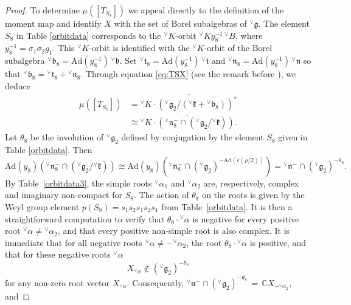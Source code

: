 \documentclass[a4paper, 11pt]{article}
\begin{document}
\begin{proof}
To determine $\mu([T_{S_8}])$ we appeal directly to the definition of
the moment map and identify $X$ with the set of Borel subalgebras of
${^\vee}\mathfrak{g}$.   The element  $S_{8}$ in Table
\ref{orbitdata} corresponds to the ${^\vee}K$-orbit  ${^\vee}K y_{8}^{-1}
\,{^\vee}B$, where $y_{8}^{-1} = \sigma_{1} \sigma_{2} g_{1}$.  This
${^\vee}K$-orbit  is identified with the ${^\vee}K$-orbit of the
Borel subalgebra  
${^\vee}\mathfrak{b}_{8} = \mathrm{Ad}(y_{8}^{-1})  \, {^\vee}\mathfrak{b}$.
Set ${^\vee}\mathfrak{t}_{8} = \mathrm{Ad}(y_{8}^{-1})  \,
{^\vee}\mathfrak{t}$ and ${^\vee}\mathfrak{n}_{8} = \mathrm{Ad}(y_{8}^{-1})  \,
{^\vee}\mathfrak{n}$ so that 
${^\vee} \mathfrak{b}_{8} =
{}^{\vee}\mathfrak{t}_8+{}^{\vee}\mathfrak{n}_8$. 
Through equation \eqref{eq:TSX} (see the remark before
\cite[Definition 2.2]{Barchini-Zierau}), we deduce  
\begin{align*}
\mu([T_{S_8}])&=  \overline{{}^\vee K \cdot
  \left({}^{\vee}\mathfrak{g}_2/
  ({}^\vee\mathfrak{k}+{}^\vee\mathfrak{b}_8)\right)^{\ast}} \\ 
&\cong \overline{{}^\vee K\cdot \left({}^\vee\mathfrak{n}_8^{-}\cap
  ({}^\vee\mathfrak{g}_2/{}^\vee\mathfrak{k})\right)}. 
\end{align*}
 Let $\theta_{8}$  be the involution of ${}^\vee\mathfrak{g}_2$ 
defined by conjugation by the element $S_8$ given in Table
\ref{orbitdata}.  Then 
$$\mathrm{Ad}(y_{8}) ({}^{\vee}\mathfrak{n}_8^-\cap
({}^\vee\mathfrak{g}_2/{}^\vee\mathfrak{k})) \cong \mathrm{Ad}(y_{8})
({}^{\vee}\mathfrak{n}_8^-\cap 
({}^\vee\mathfrak{g}_2)^{-\mathrm{Ad}(e(\rho/2))} ) = 
{}^{\vee}\mathfrak{n}^-\cap  ({}^\vee\mathfrak{g}_2)^{-\theta_8}.$$
By Table~\ref{orbitdata3}, the simple roots ${}^\vee\alpha_1$ 
and ${}^\vee\alpha_2$ are, respectively, complex and imaginary
non-compact for $S_8$. The action of $\theta_{8}$ on the roots is
given by the Weyl group element  \(p(S_8) = s_1 s_2 s_1 s_2 s_1\) from
Table~\ref{orbitdata}.  It is then a straightforward computation to verify that
\(\theta_8 \cdot {}^\vee\alpha\) is negative for every positive root
${^\vee}\alpha \neq {^\vee}\alpha_{2}$, and that every 
positive non-simple root is also complex.  
It is immediate that
for all negative roots ${}^{\vee}\alpha\neq - {^\vee}\alpha_2$,  the root
$\theta_{8} \cdot {}^\vee\alpha $ is positive, and that for
these negative roots ${^\vee}\alpha$
\[X_{{}^\vee\alpha} \notin  ({}^\vee\mathfrak{g}_2)^{-\theta_8}\]
for any non-zero root vector $X_{{^\vee}\alpha}$. 
Consequently,
$
{}^\vee\mathfrak{n}^-\cap ({}^\vee\mathfrak{g}_2)^{-\theta_8}\, =\,
\mathbb{C}X_{-{}^\vee\alpha_2}$, and  

\end{proof}
\end{document}
